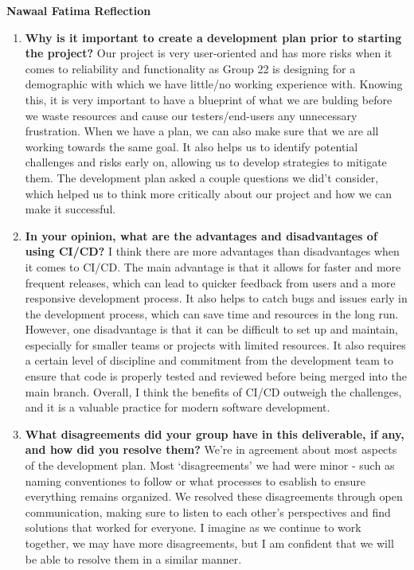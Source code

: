 \documentclass{article}
\begin{document}
\textbf{Nawaal Fatima Reflection}
\begin{enumerate}
    \item  \textbf{Why is it important to create a development plan prior to starting the
    project?} \newline
    Our project is very user-oriented and has more risks when it comes to reliability and functionality as Group 22 is designing for a demographic with which we have little/no working experience with.
    Knowing this, it is very important to have a blueprint of what we are bulding before we waste resources and cause our testers/end-users any unnecessary frustration. 
    When we have a plan, we can also make sure that we are all working towards the same goal. It also helps us to identify potential challenges and risks early on, allowing us to develop strategies to mitigate them.
    The development plan asked a couple questions we did't consider, which helped us to think more critically about our project and how we can make it successful.
    
    \item \textbf{In your opinion, what are the advantages and disadvantages of using
    CI/CD?} \newline
    I think there are more advantages than disadvantages when it comes to CI/CD.
    The main advantage is that it allows for faster and more frequent releases, which can lead to quicker feedback from users and a more responsive development process.
    It also helps to catch bugs and issues early in the development process, which can save time and resources in the long run.
    However, one disadvantage is that it can be difficult to set up and maintain, especially for smaller teams or projects with limited resources.
    It also requires a certain level of discipline and commitment from the development team to ensure that code is properly tested and reviewed before being merged into the main branch.
    Overall, I think the benefits of CI/CD outweigh the challenges, and it is a valuable practice for modern software development.

    \item \textbf{What disagreements did your group have in this deliverable, if any,
    and how did you resolve them?}\newline
    We're in agreement about most aspects of the development plan. Most `disagreements' we had were minor - such as naming conventiones to follow or what processes to esablish to ensure everything remains organized.
    We resolved these disagreements through open communication, making sure to listen to each other's perspectives and find solutions that worked for everyone.
    I imagine as we continue to work together, we may have more disagreements, but I am confident that we will be able to resolve them in a similar manner.
\end{enumerate}
\end{document}
